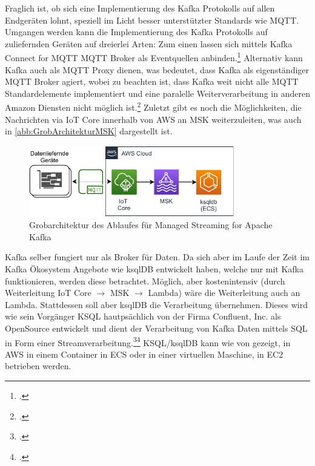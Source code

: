 Fraglich ist, ob sich eine Implementierung des Kafka Protokolls auf allen Endgeräten lohnt, speziell im Licht besser unterstützter Standards wie \ac{MQTT}. Umgangen werden kann die Implementierung des Kafka Protokolls auf zuliefernden Geräten auf dreierlei Arten: Zum einen lassen sich mittels Kafka Connect for \ac{MQTT} \ac{MQTT} Broker als Eventquellen anbinden.\footcite[Vgl.][]{Erber.12.01.2021} Alternativ kann Kafka auch als \ac{MQTT} Proxy dienen, was bedeutet, dass Kafka als eigenständiger MQTT Broker agiert, wobei zu beachten ist, dass Kafka weit nicht alle \ac{MQTT} Standardelemente implementiert und eine paralelle Weiterverarbeitung in anderen Amazon Diensten nicht möglich ist.\footcite[Vgl.][]{Erber.12.01.2021} Zuletzt gibt es noch die Möglichkeiten, die Nachrichten via \ac{IoT} Core innerhalb von \ac{AWS} an \ac{MSK} weiterzuleiten, was auch in \autoref{abb:GrobArchitekturMSK} dargestellt ist.
\begin{figure}[H]
\centering
\includegraphics[width=0.8\textwidth]{graphics/MSK-general.pdf}
\caption{Grobarchitektur des Ablaufes für Managed Streaming for Apache Kafka}
\label{abb:GrobArchitekturMSK}
\end{figure}

Kafka selber fungiert nur als Broker für Daten. Da sich aber im Laufe der Zeit im Kafka Ökosystem Angebote wie ksqlDB entwickelt haben, welche nur mit Kafka funktionieren, werden diese betrachtet. Möglich, aber kostenintensiv (durch Weiterleitung \ac{IoT} Core  $\rightarrow$ MSK  $\rightarrow$ Lambda) wäre die Weiterleitung auch an Lambda. Stattdessen soll aber ksqlDB die Verarbeitung übernehmen. Dieses wird wie sein Vorgänger KSQL hautpsächlich von der Firma Confluent, Inc. als OpenSource entwickelt und dient der Verarbeitung von Kafka Daten mittels \ac{SQL} in Form einer Streamverarbeitung.\footcite[Vgl.][]{Kreps.2019}\nzitat\footcite[Vgl.][]{Narkhede.2017} KSQL/ksqlDB kann wie von \citeauthor{Penz.2020} gezeigt, in \ac{AWS} in einem Container in \ac{ECS} oder in einer virtuellen Maschine, in \ac{EC2} betrieben werden.

